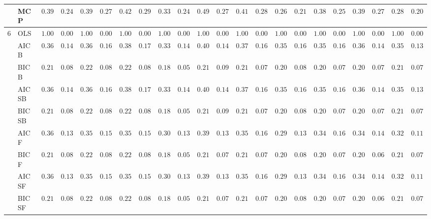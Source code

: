 \begin{tabular}{ll|ll|llllll|llllll|llllll}
 & MCP  & $0.3983$ & $0.2495$ & $0.3967$ & $0.2730$ & $0.4267$ & $0.2933$ & $0.3317$ & $0.2479$ & $0.4933$ & $0.2710$ & $0.4117$ & $0.2886$ & $0.2667$ & $0.2197$ & $0.3817$ & $0.2544$ & $0.3967$ & $0.2760$ & $0.2850$ & $0.2056$ \\\hline
6 & OLS  & $1.0000$ & $0.0000$ & $1.0000$ & $0.0000$ & $1.0000$ & $0.0000$ & $1.0000$ & $0.0000$ & $1.0000$ & $0.0000$ & $1.0000$ & $0.0000$ & $1.0000$ & $0.0000$ & $1.0000$ & $0.0000$ & $1.0000$ & $0.0000$ & $1.0000$ & $0.0000$ \\
 & AIC B  & $0.3667$ & $0.1401$ & $0.3633$ & $0.1681$ & $0.3867$ & $0.1739$ & $0.3350$ & $0.1451$ & $0.4017$ & $0.1423$ & $0.3767$ & $0.1617$ & $0.3500$ & $0.1633$ & $0.3583$ & $0.1648$ & $0.3617$ & $0.1422$ & $0.3583$ & $0.1306$ \\
 & BIC B  & $0.2183$ & $0.0844$ & $0.2200$ & $0.0850$ & $0.2233$ & $0.0861$ & $0.1867$ & $0.0594$ & $0.2183$ & $0.0908$ & $0.2150$ & $0.0760$ & $0.2067$ & $0.0825$ & $0.2067$ & $0.0715$ & $0.2050$ & $0.0705$ & $0.2150$ & $0.0760$ \\
 & AIC SB  & $0.3667$ & $0.1401$ & $0.3633$ & $0.1681$ & $0.3867$ & $0.1739$ & $0.3350$ & $0.1451$ & $0.4017$ & $0.1423$ & $0.3767$ & $0.1617$ & $0.3500$ & $0.1633$ & $0.3583$ & $0.1648$ & $0.3617$ & $0.1422$ & $0.3583$ & $0.1306$ \\
 & BIC SB  & $0.2183$ & $0.0844$ & $0.2200$ & $0.0850$ & $0.2233$ & $0.0861$ & $0.1867$ & $0.0594$ & $0.2183$ & $0.0908$ & $0.2150$ & $0.0760$ & $0.2067$ & $0.0825$ & $0.2067$ & $0.0715$ & $0.2050$ & $0.0705$ & $0.2150$ & $0.0760$ \\
 & AIC F  & $0.3650$ & $0.1375$ & $0.3533$ & $0.1576$ & $0.3550$ & $0.1565$ & $0.3000$ & $0.1340$ & $0.3933$ & $0.1372$ & $0.3500$ & $0.1615$ & $0.2967$ & $0.1373$ & $0.3483$ & $0.1626$ & $0.3417$ & $0.1409$ & $0.3283$ & $0.1195$ \\
 & BIC F  & $0.2167$ & $0.0838$ & $0.2200$ & $0.0850$ & $0.2217$ & $0.0856$ & $0.1867$ & $0.0594$ & $0.2133$ & $0.0789$ & $0.2133$ & $0.0752$ & $0.2050$ & $0.0816$ & $0.2067$ & $0.0715$ & $0.2017$ & $0.0682$ & $0.2167$ & $0.0768$ \\
 & AIC SF  & $0.3650$ & $0.1375$ & $0.3533$ & $0.1576$ & $0.3550$ & $0.1565$ & $0.3000$ & $0.1340$ & $0.3933$ & $0.1372$ & $0.3500$ & $0.1615$ & $0.2967$ & $0.1373$ & $0.3483$ & $0.1626$ & $0.3417$ & $0.1409$ & $0.3283$ & $0.1195$ \\
 & BIC SF  & $0.2167$ & $0.0838$ & $0.2200$ & $0.0850$ & $0.2217$ & $0.0856$ & $0.1867$ & $0.0594$ & $0.2133$ & $0.0789$ & $0.2133$ & $0.0752$ & $0.2050$ & $0.0816$ & $0.2067$ & $0.0715$ & $0.2017$ & $0.0682$ & $0.2167$ & $0.0768$ \\

\end{tabular}
